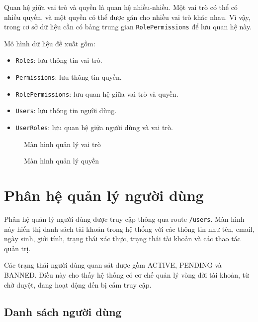 \documentclass[12pt,a4paper]{report}
\begin{document}
Quan hệ giữa vai trò và quyền là quan hệ nhiều-nhiều. Một vai trò có thể có nhiều quyền, và một quyền có thể được gán cho nhiều vai trò khác nhau. Vì vậy, trong cơ sở dữ liệu cần có bảng trung gian \texttt{RolePermissions} để lưu quan hệ này.

Mô hình dữ liệu đề xuất gồm:

\begin{itemize}
    \item \texttt{Roles}: lưu thông tin vai trò.
    \item \texttt{Permissions}: lưu thông tin quyền.
    \item \texttt{RolePermissions}: lưu quan hệ giữa vai trò và quyền.
    \item \texttt{Users}: lưu thông tin người dùng.
    \item \texttt{UserRoles}: lưu quan hệ giữa người dùng và vai trò.
\end{itemize}

\begin{figure}[H]
    \centering
    \caption{Màn hình quản lý vai trò}
    \label{fig:roles-management}
\end{figure}

\begin{figure}[H]
    \centering
    \caption{Màn hình quản lý quyền}
    \label{fig:permissions-management}
\end{figure}

\section{Phân hệ quản lý người dùng}

Phân hệ quản lý người dùng được truy cập thông qua route \texttt{/users}. Màn hình này hiển thị danh sách tài khoản trong hệ thống với các thông tin như tên, email, ngày sinh, giới tính, trạng thái xác thực, trạng thái tài khoản và các thao tác quản trị.

Các trạng thái người dùng quan sát được gồm ACTIVE, PENDING và BANNED. Điều này cho thấy hệ thống có cơ chế quản lý vòng đời tài khoản, từ chờ duyệt, đang hoạt động đến bị cấm truy cập.

\subsection{Danh sách người dùng}
\end{document}
